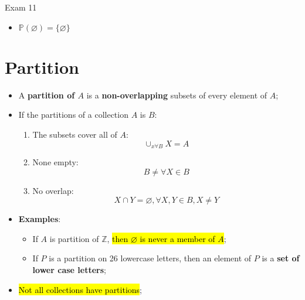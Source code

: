 \documentclass{note}
\begin{document}
\begin{note}{Exam 11}
    \begin{itemize}
        \item $ \mathbb{P} \left( \varnothing \right) = \{ \varnothing \} $
    \end{itemize}

\section{Partition}

\begin{itemize}
    \item A \textbf{partition of $ A $} is a \textbf{non-overlapping} subsets of every element of $ A $;
    \item If the partitions of a collection $ A $ is $ B $:
    \begin{enumerate}
        \item The subsets cover all of $ A $:
        \begin{displaymath}
            \cup_{x \forall B} X = A
        \end{displaymath}
        
        \item None empty:
        \begin{displaymath}
            B \neq \forall X \in B
        \end{displaymath}
        
        \item No overlap:
        \begin{displaymath}
            X \cap Y = \varnothing, \forall X, Y \in B, X \neq Y
        \end{displaymath}
    \end{enumerate}

    \item \textbf{Examples}:
    \begin{itemize}
        \item If $ A $ is partition of $ \mathbb{Z} $, \hl{then $ \varnothing $ is never a member of $ A $};
        \item If $ P $ is a partition on 26 lowercase letters, then an element of $ P $ is a \textbf{set of lower case letters};
    \end{itemize}

    \item \hl{Not all collections have partitions};


\end{itemize}
\end{note}
\end{document}
